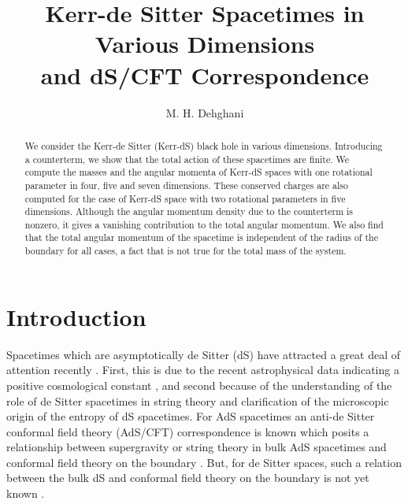 \documentclass[a4paper,12pt,onecolumn]{revtex4}
\begin{document}
\title{Kerr-de Sitter Spacetimes in Various Dimensions\\
and dS/CFT Correspondence}
\author{M. H. Dehghani}
\address{Physics Department and Biruni  Observatory,
         Shiraz University, Shiraz 71454, Iran}
\begin{abstract}
We consider the Kerr-de Sitter (Kerr-dS) black hole in various
dimensions. Introducing a counterterm, we show that the total
action of these spacetimes are finite. We compute the masses and
the angular momenta of Kerr-dS spaces with one rotational
parameter in four, five and seven dimensions. These conserved
charges are also computed for the case of Kerr-dS space with two
rotational parameters in five dimensions. Although the angular
momentum density due to the counterterm is nonzero, it gives a
vanishing contribution to the total angular momentum. We also find
that the total angular momentum of the spacetime is independent of
the radius of the boundary for all cases, a fact that is not true
for the total mass of the system.
\end{abstract}

\maketitle




\section{Introduction\label{Intro}}

Spacetimes which are asymptotically de Sitter (dS) have attracted
a great deal of attention recently
\cite{Stro1,Bal1,Wit1,Kl1,Bal2,Stro2,Kl2}. First, this is due to
the recent astrophysical data indicating a positive cosmological
constant \cite{Perl}, and second because of the understanding of
the role of de Sitter spacetimes in string theory and
clarification of the microscopic origin of the entropy of dS
spacetimes. For AdS spacetimes an anti-de Sitter conformal field
theory (AdS/CFT) correspondence is known which posits a
relationship between supergravity or string theory in bulk AdS
spacetimes and conformal field theory on the boundary
\cite{Wit2,Haw1, Mal1,Deh2}. But, for de Sitter spaces, such a
relation between the bulk dS and conformal field theory on the
boundary is not yet known \cite{Kl2,Bal2}.
\end{document}
